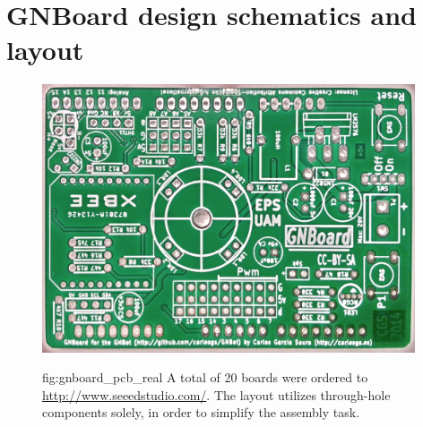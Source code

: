 \chapter{GNBoard design schematics and layout}
\label{Appendix:circuits}
\vspace{-1cm}


\begin{figure}[h!]
\centerline{\mbox{\includegraphics[width=11cm]{images/gnboard_pcb_real.jpg}}}
{fig:gnboard_pcb_real}{
A total of 20 boards were ordered to \url{http://www.seeedstudio.com/}. The layout utilizes through-hole components solely, in order to simplify the assembly task.
}
\end{figure}




